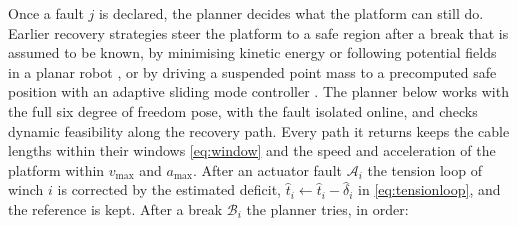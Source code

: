 \documentclass[10pt]{article}
\begin{document}
Once a fault $j$ is declared, the planner decides what the platform can still do. Earlier recovery strategies steer the platform to a safe region after a break that is assumed to be known, by minimising kinetic energy or following potential fields in a planar robot \citep{boumann2019emergency}, or by driving a suspended point mass to a precomputed safe position with an adaptive sliding mode controller \citep{dipaola2024smapid}. The planner below works with the full six degree of freedom pose, with the fault isolated online, and checks dynamic feasibility along the recovery path. Every path it returns keeps the cable lengths within their windows \eqref{eq:window} and the speed and acceleration of the platform within $v_{\max}$ and $a_{\max}$. After an actuator fault $\mathcal A_i$ the tension loop of winch $i$ is corrected by the estimated deficit, $\hat t_i\leftarrow\hat t_i-\hat\delta_i$ in \eqref{eq:tensionloop}, and the reference is kept. After a break $\mathcal B_i$ the planner tries, in order:
\end{document}
